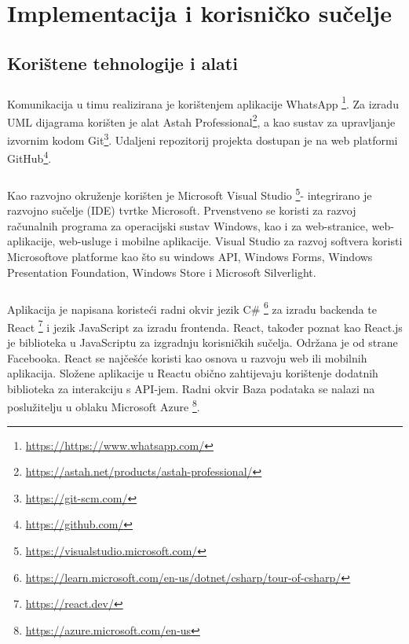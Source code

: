 \chapter{Implementacija i korisničko sučelje}

\section{Korištene tehnologije i alati}

\paragraph{}
{Komunikacija u timu realizirana je korištenjem aplikacije WhatsApp \footnote{\url{https://https://www.whatsapp.com/}}. Za izradu UML dijagrama korišten je alat Astah Professional\footnote{\url{https://astah.net/products/astah-professional/}}, a kao sustav za upravljanje izvornim kodom Git\footnote{\url{https://git-scm.com/}}. Udaljeni repozitorij projekta dostupan je na web platformi GitHub\footnote{\url{https://github.com/}}.
}
\paragraph{}{
Kao razvojno okruženje korišten je Microsoft Visual Studio \footnote{\url{https://visualstudio.microsoft.com/}}- integrirano je razvojno sučelje (IDE) tvrtke Microsoft. Prvenstveno se koristi za razvoj računalnih programa za operacijski sustav Windows, kao i za web-stranice, web-aplikacije, web-usluge i mobilne aplikacije. Visual Studio za razvoj softvera koristi Microsoftove platforme kao što su windows API, Windows Forms, Windows Presentation Foundation, Windows Store i Microsoft Silverlight.
}
\paragraph{}{
Aplikacija je napisana koristeći radni okvir jezik C\# \footnote{\url{https://learn.microsoft.com/en-us/dotnet/csharp/tour-of-csharp/}} za izradu backenda te React \footnote{\url{https://react.dev/}} i jezik JavaScript za izradu frontenda. React, također poznat kao React.js je biblioteka u JavaScriptu za izgradnju korisničkih sučelja. Održana je od strane Facebooka. React se najčešće koristi kao osnova u razvoju web ili mobilnih aplikacija. Složene aplikacije u Reactu obično zahtijevaju korištenje dodatnih biblioteka za interakciju s API-jem. Radni okvir Baza podataka se nalazi na poslužitelju u oblaku Microsoft Azure \footnote{\url{https://azure.microsoft.com/en-us}}.
}	



